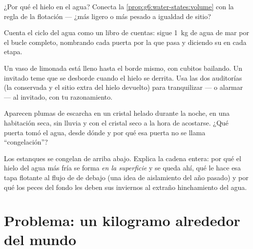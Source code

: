 \begin{exercise}[$\star$]\label{exo:g6:water-states:8}
¿Por qué  el hielo en el agua? Conecta la
\cref{prop:g6:water-states:volume} con la regla de la flotación ---
¿más ligero o más pesado a igualdad de sitio?
\end{exercise}

\begin{exercise}[$\star\star$]\label{exo:g6:water-states:9}
Cuenta el ciclo del agua como un libro de cuentas: sigue \qty{1}{kg}
de agua de mar por el bucle completo, nombrando cada puerta por la que
pasa y diciendo su  en cada etapa.
\end{exercise}

\begin{exercise}[$\star\star$]\label{exo:g6:water-states:10}
Un vaso de limonada está lleno hasta el borde mismo, con cubitos
bailando. Un invitado teme que se desborde cuando el hielo
se derrita. Usa las dos auditorías (la  conservada y el
sitio extra del hielo devuelto) para tranquilizar --- o alarmar --- al
invitado, con tu razonamiento.
\end{exercise}

\begin{exercise}[$\star\star$]\label{exo:g6:water-states:11}
Aparecen plumas de escarcha en un cristal helado durante la noche, en
una habitación seca, sin lluvia y con el cristal seco a la hora de
acostarse. ¿Qué puerta tomó el agua, desde dónde y por qué esa puerta
no se llama ``congelación''?
\end{exercise}

\begin{exercise}[$\star\star\star$]\label{exo:g6:water-states:12}
Los estanques se congelan de arriba abajo. Explica la cadena
entera: por qué el hielo del agua más fría se forma \emph{en la
superficie} y se queda ahí, qué le hace esa tapa flotante al flujo de
 de debajo (una idea de aislamiento del año pasado) y por qué
los peces del fondo les deben sus inviernos al extraño hinchamiento
del agua.
\end{exercise}

\section{Problema: un kilogramo alrededor del mundo}


